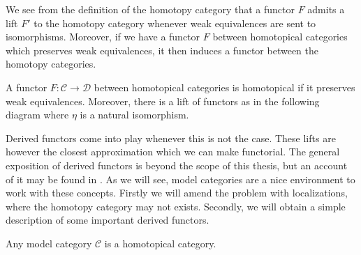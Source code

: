\documentclass[../thesis.tex]{subfiles}
\begin{document}
            We see from the definition of the homotopy category that a functor $F$ admits a lift $F'$ to the homotopy category whenever weak equivalences are sent to isomorphisms. Moreover, if we have a functor $F$ between homotopical categories which preserves weak equivalences, it then induces a functor between the homotopy categories.
            
            \begin{definition}
                A functor $F:\mathcal{C}\rightarrow \mathcal{D}$ between homotopical categories is homotopical if it preserves weak equivalences. Moreover, there is a lift of functors as in the following diagram where $\eta$ is a natural isomorphism.

                \begin{center}
                \end{center}
            \end{definition}

            Derived functors come into play whenever this is not the case. These lifts are however the closest approximation which we can make functorial. The general exposition of derived functors is beyond the scope of this thesis, but an account of it may be found in \cite{Riehl16}. As we will see, model categories are a nice environment to work with these concepts. Firstly we will amend the problem with localizations, where the homotopy category may not exists. Secondly, we will obtain a simple description of some important derived functors.

            \begin{proposition}
                Any model category $\mathcal{C}$ is a homotopical category.
            \end{proposition}
\end{document}
